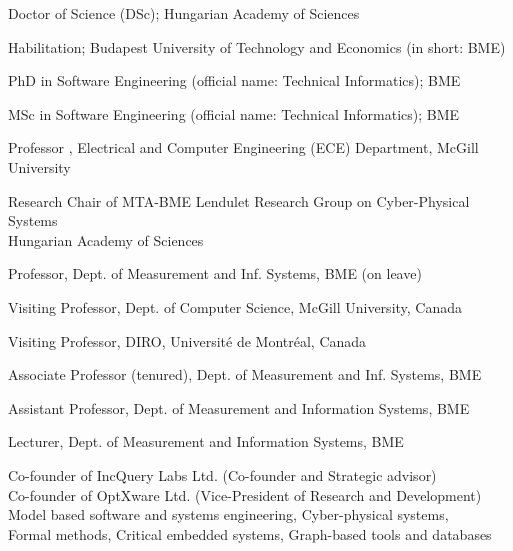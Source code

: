 \documentclass{xetexCV}
\begin{document}
\makecvtitle

Doctor of Science (DSc); Hungarian Academy of Sciences  


Habilitation; Budapest University of Technology and Economics (in short: BME) 

PhD in Software Engineering (official name: Technical Informatics);
BME %

MSc in Software Engineering (official name: Technical Informatics); 
BME %

Professor , Electrical and Computer Engineering (ECE) Department, McGill University

Research Chair  of MTA-BME Lendulet Research Group on Cyber-Physical Systems \\ Hungarian Academy of Sciences 

Professor,  Dept. of Measurement and Inf. Systems, BME  (on leave)

Visiting Professor,  Dept. of Computer Science, McGill University, Canada

Visiting Professor,  DIRO, Universit\'e de Montr\'eal, Canada

Associate Professor (tenured),  Dept. of Measurement and
Inf. Systems, BME 	

Assistant Professor, Dept. of Measurement and
Information Systems, BME 

Lecturer, Dept. of Measurement and Information
Systems, BME

Co-founder of IncQuery Labs Ltd. (Co-founder and Strategic advisor)   \\
Co-founder of OptXware Ltd. (Vice-President of Research and Development)  \\

Model based software and systems engineering, Cyber-physical systems, \\
Formal methods, Critical embedded systems, Graph-based tools and databases
\end{document}
